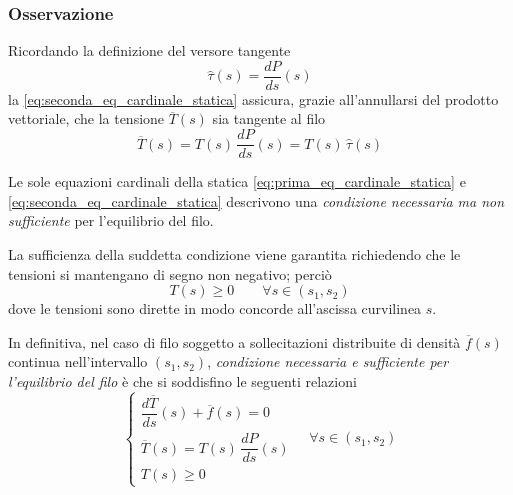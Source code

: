 \subsubsection*{Osservazione}
Ricordando la definizione del versore tangente
\[
\hat{\tau}(s) = \dfrac{dP}{ds}(s)
\]
la \eqref{eq:seconda_eq_cardinale_statica} assicura, grazie all'annullarsi del prodotto vettoriale, che la tensione $\overline{T}(s)$ sia tangente al filo
\[
\overline{T}(s) = T(s)\,\dfrac{dP}{ds}(s) = T(s)\,\hat{\tau}(s)
\]

Le sole equazioni cardinali della statica \eqref{eq:prima_eq_cardinale_statica} e \eqref{eq:seconda_eq_cardinale_statica} descrivono una \emph{condizione necessaria ma non sufficiente} per l'equilibrio del filo.

La sufficienza della suddetta condizione viene garantita richiedendo che le tensioni si mantengano di segno non negativo; perciò
\[
T(s)\geq 0\qquad \forall s\in(s_1, s_2)
\]
dove le tensioni sono dirette in modo concorde all'ascissa curvilinea $s$.

In definitiva, nel caso di filo soggetto a sollecitazioni distribuite di densità $\overline{f}(s)$ continua nell'intervallo $(s_1, s_2)$, \emph{condizione necessaria e sufficiente per l'equilibrio del filo} è che si soddisfino le seguenti relazioni
\begin{equation}
	\label{eq:cns_equilibrio}
	\begin{cases}
		\dfrac{d\overline{T}}{ds}(s) + \overline{f}(s) = 0\\
		\overline{T}(s) = T(s)\,\dfrac{dP}{ds}(s)\\
		T(s) \geq 0
	\end{cases}
	\quad \forall s \in(s_1, s_2)
\end{equation}

